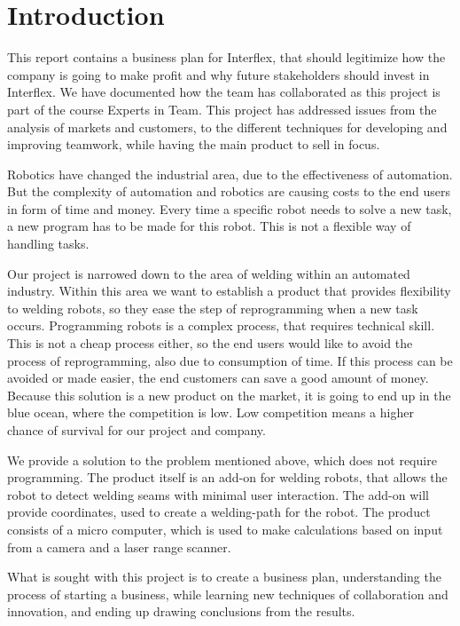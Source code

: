 \section{Introduction}

This report contains a business plan for Interflex, that should legitimize how the company is going to make profit and why future stakeholders should invest in Interflex. 
We have documented how the team has collaborated as this project is part of the course Experts in Team.
This project has addressed issues from the analysis of markets and customers, to the different techniques for developing and improving teamwork, while having the main product to sell in focus.

Robotics have changed the industrial area, due to the effectiveness of automation. But the complexity of automation and robotics are causing costs to the end users in form of time and money. Every time a specific robot needs to solve a new task, a new program has to be made for this robot. This is not a flexible way of handling tasks. 

Our project is narrowed down to the area of welding within an automated industry. Within this area we want to establish a product that provides flexibility to welding robots, so they ease the step of reprogramming when a new task occurs. Programming robots is a complex process, that requires technical skill. This is not a cheap process either, so the end users would like to avoid the process of reprogramming, also due to consumption of time. If this process can be avoided or made easier, the end customers can save a good amount of money. Because this solution is a new product on the market, it is going to end up in the blue ocean, where the competition is low. Low competition means a higher chance of survival for our project and company.

We provide a solution to the problem mentioned above, which does not require programming. The product itself is an add-on for welding robots, that allows the robot to detect welding seams with minimal user interaction. The add-on will provide coordinates, used to create a welding-path for the robot. 
The product consists of a micro computer, which is used to make calculations based on input from a camera and a laser range scanner. 

What is sought with this project is to create a business plan, understanding the process of starting a business, while learning new techniques of collaboration and innovation, and ending up drawing conclusions from the results.
